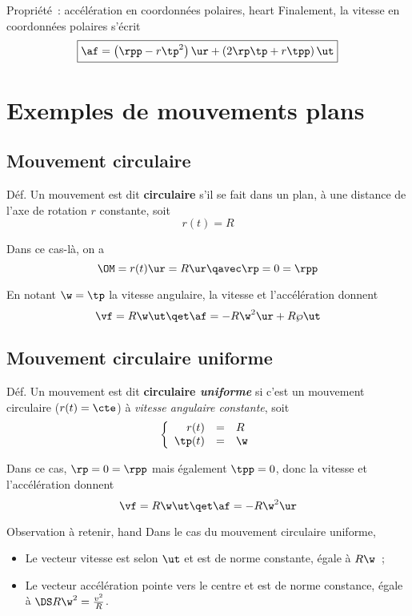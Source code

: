 \documentclass[../main/main.tex]{subfiles}
\begin{document}

\begin{tprop}{Propriété~: accélération en coordonnées polaires, heart}
    Finalement, la vitesse en coordonnées polaires s'écrit
    \[\boxed{\af = \left( \rpp -r\tp^2 \right)\ur + \left( 2\rp\tp+r\tpp
    \right)\ut}\]
\end{tprop}

\section{Exemples de mouvements plans}
\subsection{Mouvement circulaire}

\begin{rdefi}{Déf.}
    Un mouvement est dit \textbf{circulaire} s'il se fait dans un plan, à une
    distance de l'axe de rotation $r$ constante, soit
    \[
        r(t) = R
    \]
\end{rdefi}

Dans ce cas-là, on a
\[
    \OM = r(t)\ur = R\ur
    \qavec
    \rp = 0 = \rpp
\]

En notant $\w = \tp$ la vitesse angulaire, la vitesse et l'accélération donnent
\[
    \vf = R\w\ut
    \qet
    \af = -R\w^2\ur + R\wp\ut
\]

\subsection{Mouvement circulaire uniforme}
\begin{rdefi}{Déf.}
    Un mouvement est dit \textbf{circulaire \textit{uniforme}} si c'est un
    mouvement circulaire ($r(t) = \cte$) à \textit{vitesse angulaire
    constante}, soit
    \[
        \left\{
            \begin{array}{rcl}
                r(t) & = & R\\
                \tp(t) & = & \w
            \end{array}
        \right.
    \]
\end{rdefi}

Dans ce cas, $\rp = 0 = \rpp$ mais également $\tpp = 0$, donc la vitesse et
l'accélération donnent
\[
    \vf = R\w\ut
    \qet
    \af = -R\w^2\ur
\]

\begin{tror}{Observation à retenir, hand}
    Dans le cas du mouvement circulaire uniforme,
    \begin{itemize}
        \item Le vecteur vitesse est selon $\ut$ et est de norme constante,
            égale à $R\w$~;
        \item Le vecteur accélération pointe vers le centre et est de norme
            constance, égale à $\DS R\w^2 = \frac{v^2}{R}$.
    \end{itemize}
\end{tror}
\end{document}
